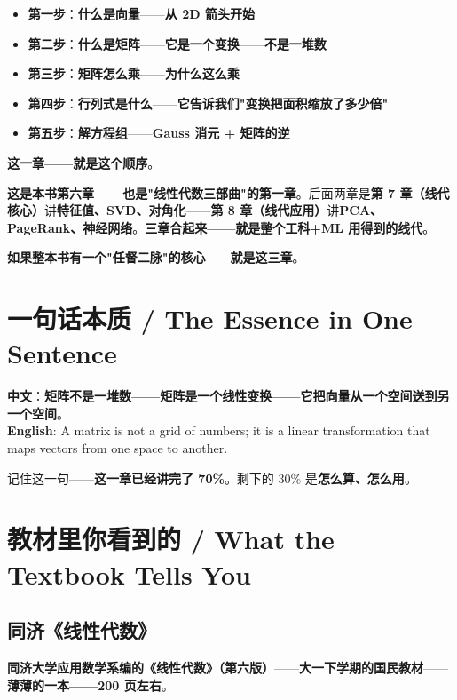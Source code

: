 \begin{itemize}
\item \textbf{第一步}：\textbf{什么是向量}——\textbf{从 2D 箭头开始}
\item \textbf{第二步}：\textbf{什么是矩阵}——\textbf{它是一个变换}——\textbf{不是一堆数}
\item \textbf{第三步}：\textbf{矩阵怎么乘}——\textbf{为什么这么乘}
\item \textbf{第四步}：\textbf{行列式是什么}——\textbf{它告诉我们"变换把面积缩放了多少倍"}
\item \textbf{第五步}：\textbf{解方程组}——\textbf{Gauss 消元 + 矩阵的逆}
\end{itemize}

\textbf{这一章——就是这个顺序}。

\textbf{这是本书第六章——也是"线性代数三部曲"的第一章}。后面两章是\textbf{第 7 章（线代核心）}讲\textbf{特征值、SVD、对角化}——\textbf{第 8 章（线代应用）}讲\textbf{PCA、PageRank、神经网络}。\textbf{三章合起来——就是整个工科+ML 用得到的线代}。

\textbf{如果整本书有一个"任督二脉"的核心}——\textbf{就是这三章}。

\section{一句话本质 / The Essence in One Sentence}

\begin{tcolorbox}[essbox={一句话本质}]
\textbf{中文}：\textbf{矩阵不是一堆数——矩阵是一个线性变换——它把向量从一个空间送到另一个空间}。\\[6pt]
\textbf{English}: A matrix is not a grid of numbers; it is a linear transformation that maps vectors from one space to another.
\end{tcolorbox}

记住这一句——\textbf{这一章已经讲完了 70\%}。剩下的 30\% 是\textbf{怎么算、怎么用}。

\section{教材里你看到的 / What the Textbook Tells You}

\subsection{同济《线性代数》}

\textbf{同济大学应用数学系编的《线性代数》（第六版）}——\textbf{大一下学期的国民教材}——\textbf{薄薄的一本——200 页左右}。

